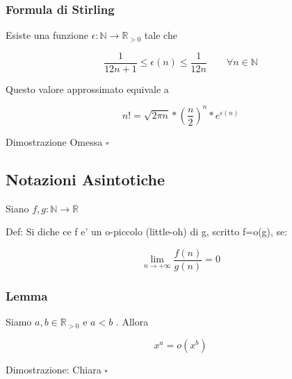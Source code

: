 \documentclass{article}
\begin{document}
        \subsubsection{Formula di Stirling}
        \begin{flushleft}
          Esiste una funzione $\epsilon: \mathbb{N} \to \mathbb{R}_{>0}$ tale che
        \end{flushleft}
        \begin{equation*}
          \frac{1}{12n+1} \leq \epsilon(n) \leq \frac{1}{12n} \quad \quad \forall n \in \mathbb{N}
        \end{equation*}
        \begin{flushleft}
          Questo valore approssimato equivale a
        \end{flushleft}
        \begin{equation*}
          n!=\sqrt{2\pi n}*(\frac{n}{2})^n*e^{\epsilon(n)}
        \end{equation*}
        \begin{flushleft}
          Dimostrazione Omessa $\square$
        \end{flushleft}
        \subsection{Notazioni Asintotiche}
        \begin{flushleft}
          Siano $f,g: \mathbb{N} \to \mathbb{R}$
        \end{flushleft}
        \begin{flushleft}
          Def: Si diche ce f e' un o-piccolo (little-oh) di g, scritto f=o(g), se:
        \end{flushleft}
        \begin{equation*}
          \lim_{n \to +\infty} \frac{f(n)}{g(n)}=0
        \end{equation*}
        \subsubsection{Lemma}
        \begin{flushleft}
          Siamo $a,b \in \mathbb{R}_{>0}$ e $a<b$ . Allora
        \end{flushleft}
        \begin{equation*}
          x^a=o(x^b)
        \end{equation*}
        \begin{flushleft}
          Dimostrazione: Chiara $\square$
        \end{flushleft}
\end{document}
